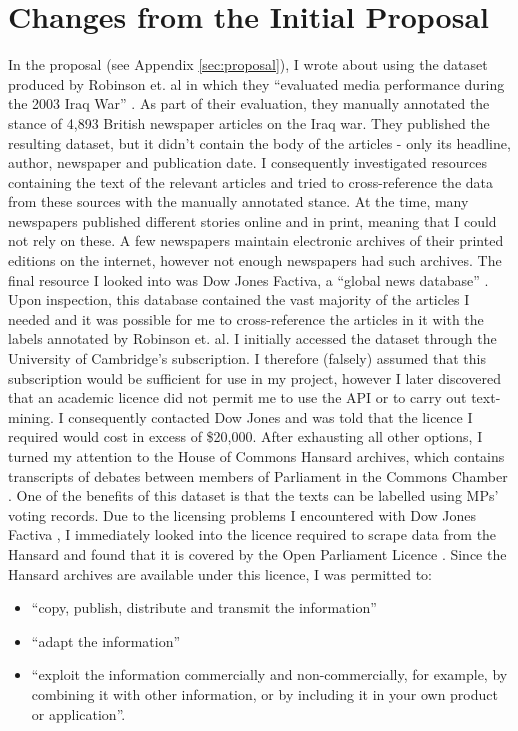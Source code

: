 \documentclass[12pt,a4paper,twoside,openright]{report}
\begin{document}
\section{Changes from the Initial Proposal} \label{prep-changes}
In the proposal (see Appendix \ref{sec:proposal}), I wrote about using the dataset produced by Robinson et. al in which they ``evaluated media performance during the 2003 Iraq War'' \cite{iraq_media_study}. As part of their evaluation, they manually annotated the stance of 4,893 British newspaper articles on the Iraq war. They published the resulting dataset, but it didn't contain the body of the articles - only its headline, author, newspaper and publication date. I consequently investigated resources containing the text of the relevant articles and tried to cross-reference the data from these sources with the manually annotated stance. At the time, many newspapers published different stories online and in print, meaning that I could not rely on these. A few newspapers maintain electronic archives of their printed editions on the internet, however not enough newspapers had such archives. The final resource I looked into was Dow Jones Factiva, a ``global news database'' \cite{factiva}. Upon inspection, this database contained the vast majority of the articles I needed and it was possible for me to cross-reference the articles in it with the labels annotated by Robinson et. al. I initially accessed the dataset through the University of Cambridge's subscription. I therefore (falsely) assumed that this subscription would be sufficient for use in my project, however I later discovered that an academic licence did not permit me to use the API or to carry out text-mining. I consequently contacted Dow Jones and was told that the licence I required would cost in excess of \$20,000.
\newline
\newline
After exhausting all other options, I turned my attention to the House of Commons Hansard archives, which contains transcripts of debates between members of Parliament in the Commons Chamber \cite{hansard}. One of the benefits of this dataset is that the texts can be labelled using MPs' voting records.
\newline
\newline
Due to the licensing problems I encountered with Dow Jones Factiva \cite{factiva}, I immediately looked into the licence required to scrape data from the Hansard and found that it is covered by the Open Parliament Licence \cite{open_parliament_licence}. Since the Hansard archives are available under this licence, I was permitted to:
\begin{itemize}
	\item ``copy, publish, distribute and transmit the information''
	\item ``adapt the information''
	\item ``exploit the information commercially and non-commercially, for example, by combining it with other information, or by including it in your own product or application''.
\end{itemize}
\end{document}
